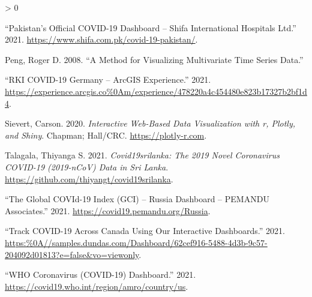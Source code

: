 \documentclass[
]{article}
\newlength{\cslhangindent}
\newenvironment{CSLReferences}[2] %
 {%
  \setlength{\parindent}{0pt}
  \ifodd #1 \everypar{\setlength{\hangindent}{\cslhangindent}}\ignorespaces\fi
  \ifnum #2 > 0
  \setlength{\parskip}{#2\baselineskip}
  \fi
 }%
 {}
\begin{document}
\begin{CSLReferences}{1}{0}
\leavevmode\hypertarget{ref-pakistan}{}%
{``{Pakistan's Official COVID-19 Dashboard -- Shifa International
Hospitals Ltd}.''} 2021.
\url{https://www.shifa.com.pk/covid-19-pakistan/}.

\leavevmode\hypertarget{ref-peng2008method}{}%
Peng, Roger D. 2008. {``A Method for Visualizing Multivariate Time
Series Data.''}

\leavevmode\hypertarget{ref-rki}{}%
{``{RKI COVID-19 Germany -- ArcGIS Experience}.''} 2021.
\url{https://experience.arcgis.co\%0Am/experience/478220a4c454480e823b17327b2bf1d4}.

\leavevmode\hypertarget{ref-plotly}{}%
Sievert, Carson. 2020. \emph{Interactive Web-Based Data Visualization
with r, Plotly, and Shiny}. Chapman; Hall/CRC.
\url{https://plotly-r.com}.

\leavevmode\hypertarget{ref-talagala}{}%
Talagala, Thiyanga S. 2021. \emph{Covid19srilanka: The 2019 Novel
Coronavirus COVID-19 (2019-nCoV) Data in Sri Lanka}.
\url{https://github.com/thiyangt/covid19srilanka}.

\leavevmode\hypertarget{ref-russia}{}%
{``{The Global COVId-19 Index (GCI) -- Russia Dashboard -- PEMANDU
Associates}.''} 2021. \url{https://covid19.pemandu.org/Russia}.

\leavevmode\hypertarget{ref-canada}{}%
{``{Track COVID-19 Across Canada Using Our Interactive Dashboards}.''}
2021.
\url{https:\%0A//samples.dundas.com/Dashboard/62cef916-5488-4d3b-9c57-204092d01813?e=false\&vo=viewonly}.

\leavevmode\hypertarget{ref-who}{}%
{``{WHO Coronavirus (COVID-19) Dashboard}.''} 2021.
\url{https://covid19.who.int/region/amro/country/us}.

\end{CSLReferences}
\end{document}
